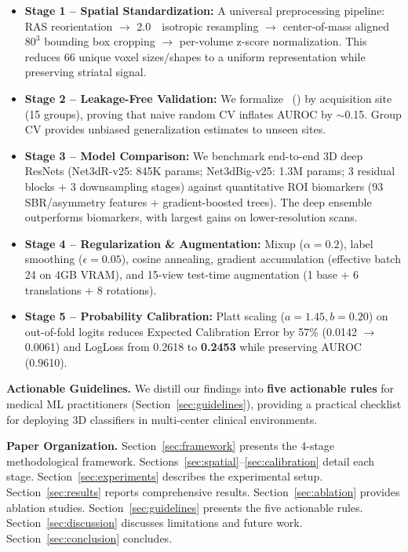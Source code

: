 \begin{itemize}
    \item \textbf{Stage 1 -- Spatial Standardization:} A universal preprocessing pipeline: RAS reorientation $\to$ 2.0~\voxelunit~isotropic resampling $\to$ center-of-mass aligned $80^3$ bounding box cropping $\to$ per-volume z-score normalization. This reduces 66 unique voxel sizes/shapes to a uniform representation while preserving striatal signal.
    
    \item \textbf{Stage 2 -- Leakage-Free Validation:} We formalize \cvname~(\cvname) by acquisition site (15 groups), proving that naive random CV inflates AUROC by $\sim$0.15. Group CV provides unbiased generalization estimates to unseen sites.
    
    \item \textbf{Stage 3 -- Model Comparison:} We benchmark end-to-end 3D deep ResNets (Net3dR-v25: 845K params; Net3dBig-v25: 1.3M params; 3 residual blocks + 3 downsampling stages) against quantitative ROI biomarkers (93 SBR/asymmetry features + gradient-boosted trees). The deep ensemble outperforms biomarkers, with largest gains on lower-resolution scans.
    
    \item \textbf{Stage 4 -- Regularization \& Augmentation:} Mixup ($\alpha=0.2$), label smoothing ($\epsilon=0.05$), cosine annealing, gradient accumulation (effective batch 24 on 4GB VRAM), and 15-view test-time augmentation (1 base + 6 translations + 8 rotations).
    
    \item \textbf{Stage 5 -- Probability Calibration:} Platt scaling ($a=1.45, b=0.20$) on out-of-fold logits reduces Expected Calibration Error by 57\% (0.0142 $\to$ 0.0061) and LogLoss from 0.2618 to \textbf{0.2453} while preserving AUROC (0.9610).
\end{itemize}

\noindent\textbf{Actionable Guidelines.}
We distill our findings into \textbf{five actionable rules} for medical ML practitioners (Section~\ref{sec:guidelines}), providing a practical checklist for deploying 3D classifiers in multi-center clinical environments.

\noindent\textbf{Paper Organization.}
Section~\ref{sec:framework} presents the 4-stage methodological framework. Sections~\ref{sec:spatial}--\ref{sec:calibration} detail each stage. Section~\ref{sec:experiments} describes the experimental setup. Section~\ref{sec:results} reports comprehensive results. Section~\ref{sec:ablation} provides ablation studies. Section~\ref{sec:guidelines} presents the five actionable rules. Section~\ref{sec:discussion} discusses limitations and future work. Section~\ref{sec:conclusion} concludes.